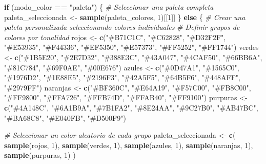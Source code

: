 \documentclass[
]{article}
\newenvironment{Shaded}{\begin{snugshade}}{\end{snugshade}}
\newcommand{\CommentTok}[1]{\textcolor[rgb]{0.56,0.35,0.01}{\textit{#1}}}
\newcommand{\ControlFlowTok}[1]{\textcolor[rgb]{0.13,0.29,0.53}{\textbf{#1}}}
\newcommand{\DecValTok}[1]{\textcolor[rgb]{0.00,0.00,0.81}{#1}}
\newcommand{\FunctionTok}[1]{\textcolor[rgb]{0.13,0.29,0.53}{\textbf{#1}}}
\newcommand{\NormalTok}[1]{#1}
\newcommand{\OtherTok}[1]{\textcolor[rgb]{0.56,0.35,0.01}{#1}}
\newcommand{\SpecialCharTok}[1]{\textcolor[rgb]{0.81,0.36,0.00}{\textbf{#1}}}
\newcommand{\StringTok}[1]{\textcolor[rgb]{0.31,0.60,0.02}{#1}}
\begin{document}
\begin{Shaded}
\begin{Highlighting}[]
\ControlFlowTok{if}\NormalTok{ (modo\_color }\SpecialCharTok{==} \StringTok{"paleta"}\NormalTok{) \{}
  \CommentTok{\# Seleccionar una paleta completa}
\NormalTok{  paleta\_seleccionada }\OtherTok{\textless{}{-}} \FunctionTok{sample}\NormalTok{(paleta\_colores, }\DecValTok{1}\NormalTok{)[[}\DecValTok{1}\NormalTok{]]}
\NormalTok{\} }\ControlFlowTok{else}\NormalTok{ \{}
  \CommentTok{\# Crear una paleta personalizada seleccionando colores individuales}
  \CommentTok{\# Definir grupos de colores por tonalidad}
\NormalTok{  rojos }\OtherTok{\textless{}{-}} \FunctionTok{c}\NormalTok{(}\StringTok{"\#B71C1C"}\NormalTok{, }\StringTok{"\#C62828"}\NormalTok{, }\StringTok{"\#D32F2F"}\NormalTok{, }\StringTok{"\#E53935"}\NormalTok{, }\StringTok{"\#F44336"}\NormalTok{, }\StringTok{"\#EF5350"}\NormalTok{, }\StringTok{"\#E57373"}\NormalTok{, }\StringTok{"\#FF5252"}\NormalTok{, }\StringTok{"\#FF1744"}\NormalTok{)}
\NormalTok{  verdes }\OtherTok{\textless{}{-}} \FunctionTok{c}\NormalTok{(}\StringTok{"\#1B5E20"}\NormalTok{, }\StringTok{"\#2E7D32"}\NormalTok{, }\StringTok{"\#388E3C"}\NormalTok{, }\StringTok{"\#43A047"}\NormalTok{, }\StringTok{"\#4CAF50"}\NormalTok{, }\StringTok{"\#66BB6A"}\NormalTok{, }\StringTok{"\#81C784"}\NormalTok{, }\StringTok{"\#69F0AE"}\NormalTok{, }\StringTok{"\#00E676"}\NormalTok{)}
\NormalTok{  azules }\OtherTok{\textless{}{-}} \FunctionTok{c}\NormalTok{(}\StringTok{"\#0D47A1"}\NormalTok{, }\StringTok{"\#1565C0"}\NormalTok{, }\StringTok{"\#1976D2"}\NormalTok{, }\StringTok{"\#1E88E5"}\NormalTok{, }\StringTok{"\#2196F3"}\NormalTok{, }\StringTok{"\#42A5F5"}\NormalTok{, }\StringTok{"\#64B5F6"}\NormalTok{, }\StringTok{"\#448AFF"}\NormalTok{, }\StringTok{"\#2979FF"}\NormalTok{)}
\NormalTok{  naranjas }\OtherTok{\textless{}{-}} \FunctionTok{c}\NormalTok{(}\StringTok{"\#BF360C"}\NormalTok{, }\StringTok{"\#E64A19"}\NormalTok{, }\StringTok{"\#F57C00"}\NormalTok{, }\StringTok{"\#FB8C00"}\NormalTok{, }\StringTok{"\#FF9800"}\NormalTok{, }\StringTok{"\#FFA726"}\NormalTok{, }\StringTok{"\#FFB74D"}\NormalTok{, }\StringTok{"\#FFAB40"}\NormalTok{, }\StringTok{"\#FF9100"}\NormalTok{)}
\NormalTok{  purpuras }\OtherTok{\textless{}{-}} \FunctionTok{c}\NormalTok{(}\StringTok{"\#4A148C"}\NormalTok{, }\StringTok{"\#6A1B9A"}\NormalTok{, }\StringTok{"\#7B1FA2"}\NormalTok{, }\StringTok{"\#8E24AA"}\NormalTok{, }\StringTok{"\#9C27B0"}\NormalTok{, }\StringTok{"\#AB47BC"}\NormalTok{, }\StringTok{"\#BA68C8"}\NormalTok{, }\StringTok{"\#E040FB"}\NormalTok{, }\StringTok{"\#D500F9"}\NormalTok{)}

  \CommentTok{\# Seleccionar un color aleatorio de cada grupo}
\NormalTok{  paleta\_seleccionada }\OtherTok{\textless{}{-}} \FunctionTok{c}\NormalTok{(}
    \FunctionTok{sample}\NormalTok{(rojos, }\DecValTok{1}\NormalTok{),}
    \FunctionTok{sample}\NormalTok{(verdes, }\DecValTok{1}\NormalTok{),}
    \FunctionTok{sample}\NormalTok{(azules, }\DecValTok{1}\NormalTok{),}
    \FunctionTok{sample}\NormalTok{(naranjas, }\DecValTok{1}\NormalTok{),}
    \FunctionTok{sample}\NormalTok{(purpuras, }\DecValTok{1}\NormalTok{)}
\NormalTok{  )}


\end{Highlighting}
\end{Shaded}
\end{document}

